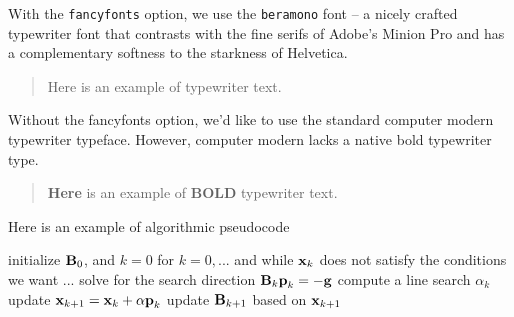 \documentclass[longtitle,sidenotes,nofancyfonts]{dgleich-article}
\begin{document}
With the \verb#fancyfonts# option, 
we use the \verb#beramono# font -- a nicely crafted typewriter font that contrasts
with the fine serifs of Adobe's Minion Pro and has a complementary softness
to the starkness of Helvetica.  

\begin{quote}
\ttfamily 
Here is an example of typewriter text.
\end{quote}

Without the fancyfonts option, we'd like to use the standard computer modern
typewriter typeface.  However, computer modern lacks a native bold typewriter type.  
\begin{quote}
 \ttfamily
\textbf{Here} is an example of \textbf{BOLD} typewriter text.
\end{quote}

Here is an example of algorithmic pseudocode
\begin{pseudocode}
initialize $\boldsymbol{\mathrm{B}}_0$, and $k = 0$
for $k=0, ...$ and while $\boldsymbol{\mathrm{x}}_k$ does not satisfy the conditions we want ...
  solve for the search direction $\boldsymbol{\mathrm{B}}_k \boldsymbol{\mathrm{p}}_k = -\boldsymbol{\mathrm{g}}$
  compute a line search $\alpha_k$
  update $\boldsymbol{\mathrm{x}}_{k+1} = \boldsymbol{\mathrm{x}}_{k} + \alpha \boldsymbol{\mathrm{p}}_k$
  update $\boldsymbol{\mathrm{B}}_{k+1}$ based on $\boldsymbol{\mathrm{x}}_{k+1}$
\end{pseudocode}
\end{document}

